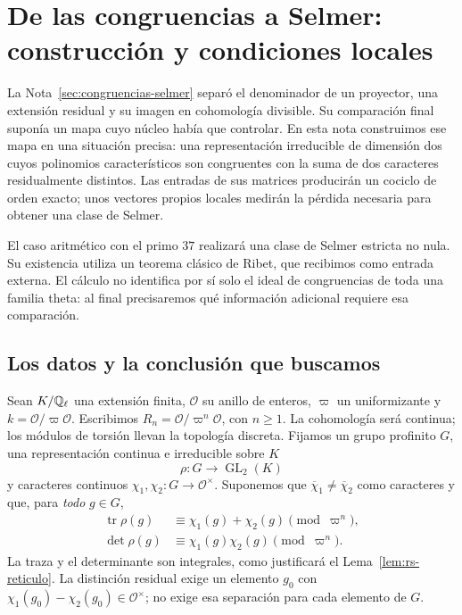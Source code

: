 \section{De las congruencias a Selmer: construcción y condiciones locales}
\label{sec:construccion-selmer}

La Nota~\ref{sec:congruencias-selmer} separó el denominador de un
proyector, una extensión residual y su imagen en cohomología divisible.
Su comparación final suponía un mapa cuyo núcleo había que controlar.
En esta nota construimos ese mapa en una situación precisa: una
representación irreducible de dimensión dos cuyos polinomios
característicos son congruentes con la suma de dos caracteres
residualmente distintos. Las entradas de sus matrices producirán
un cociclo de orden exacto; unos vectores propios locales medirán
la pérdida necesaria para obtener una clase de Selmer.

El caso aritmético con el primo $37$ realizará una clase de Selmer
estricta no nula. Su existencia utiliza un teorema clásico de Ribet,
que recibimos como entrada externa. El cálculo no identifica por sí
solo el ideal de congruencias de toda una familia theta: al final
precisaremos qué información adicional requiere esa comparación.


\subsection{Los datos y la conclusión que buscamos}

Sean $K/\mathbb{Q}_\ell$ una extensión finita, $\mathcal O$ su anillo de
enteros, $\varpi$ un uniformizante y $k=\mathcal O/\varpi\mathcal O$.
Escribimos $R_n=\mathcal O/\varpi^n\mathcal O$, con $n\ge1$.
La cohomología será continua; los módulos de torsión llevan la
topología discreta. Fijamos un grupo profinito $G$, una representación
continua e irreducible sobre $K$
\[
 \rho:G\longrightarrow\operatorname{GL}_2(K)
\]
y caracteres continuos $\chi_1,\chi_2:G\to\mathcal O^\times$.
Suponemos que $\overline\chi_1\ne\overline\chi_2$ como caracteres
y que, para \emph{todo} $g\in G$,
\begin{equation}
 \begin{split}
 \operatorname{tr}\rho(g)&\equiv\chi_1(g)+\chi_2(g)\pmod{\varpi^n},\\
 \det\rho(g)&\equiv\chi_1(g)\chi_2(g)\pmod{\varpi^n}.
 \end{split}
 \label{eq:rs-congruencia}
\end{equation}
La traza y el determinante son integrales, como justificará el
Lema~\ref{lem:rs-reticulo}. La distinción residual exige un elemento
$g_0$ con $\chi_1(g_0)-\chi_2(g_0)\in\mathcal O^\times$;
no exige esa separación para cada elemento de $G$.

